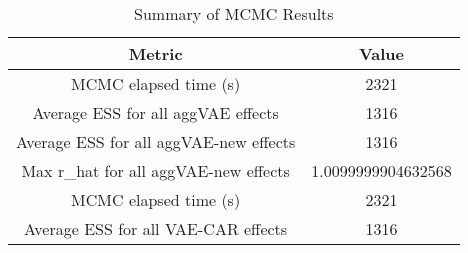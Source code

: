 
\begin{table}[h!]
\centering
\begin{tabular}{|c|c|}
\hline
\textbf{Metric} & \textbf{Value} \\
\hline
MCMC elapsed time (s) & 2321 \\
\hline
Average ESS for all aggVAE effects & 1316 \\
\hline
Average ESS for all aggVAE-new effects & 1316 \\
\hline
Max r\_hat for all aggVAE-new effects & 1.0099999904632568 \\
\hline
MCMC elapsed time (s) & 2321 \\
\hline
Average ESS for all VAE-CAR effects & 1316 \\
\hline
\end{tabular}
\caption{Summary of MCMC Results}
\label{table:mcmc_summary}
\end{table}
